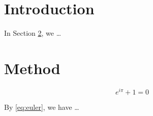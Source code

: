 \documentclass{article}
\begin{document}
\section{Introduction}
\label{sec:intro}
In Section \ref{sec:method}, we \ldots

\section{Method}
\label{sec:method}
\begin{equation}
\label{eq:euler}
e^{i\pi} + 1 = 0
\end{equation}

By \eqref{eq:euler}, we have \ldots
\end{document}
